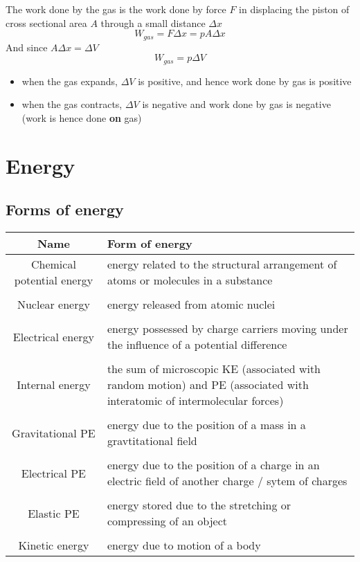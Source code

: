 \documentclass[a4paper, 10pt]{article}
\begin{document}
The work done by the gas is the work done by force $F$ in displacing the piston of cross sectional area $A$ through a small distance $\Delta x$ 
\[
   W_{gas} = F\Delta x = pA \Delta x
\]
And since $A \Delta x = \Delta V$
\[
   W_{gas} = p \Delta V
\]

\begin{itemize}
   \item when the gas expands, $\Delta V$ is positive, and hence work done by gas is positive
   \item when the gas contracts, $\Delta V$ is negative and work done by gas is negative (work is hence done \textbf{on} gas)
\end{itemize}	



\section{Energy}
\subsection{Forms of energy}
\begin{center}
   \begin{tabular}{c|L}
      Name & Form of energy \\
      \hline
      Chemical potential energy & energy related to the structural arrangement of atoms or molecules in a substance \\ 
                                & \\
      Nuclear energy & energy released from atomic nuclei \\ 
                     & \\
      Electrical energy & energy possessed by charge carriers moving under the influence of a potential difference \\
                        & \\
      Internal energy & the sum of microscopic KE (associated with random motion) and PE (associated with interatomic of intermolecular forces) \\ 
                      & \\
      Gravitational PE & energy due to the position of a mass in a gravtitational field \\
                       & \\
      Electrical PE & energy due to the position of a charge in an electric field of another charge / sytem of charges \\
                    & \\
      Elastic PE & energy stored due to the stretching or compressing of an object \\
       & \\
      Kinetic energy & energy due to motion of a body
   \end{tabular}
\end{center}
\end{document}
